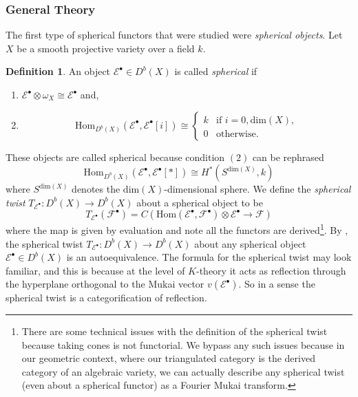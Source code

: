 \documentclass[oneside,reqno]{amsart}
\theoremstyle{definition}
\newtheorem{definition}{Definition}[section]
\theoremstyle{definition}
\theoremstyle{definition}
\theoremstyle{definition}
\newcommand{\Es}{\mathcal{E}}
\newcommand{\Fs}{\mathcal{F}}
\begin{document}
\subsubsection*{General Theory}
The first type of spherical functors that were studied were \textit{spherical objects}. Let $X$ be a smooth projective variety over a field $k$.
\begin{definition}\cite[Chapter 8]{huybrechts}
    \label{sphericalobject}
    An object $\Es^{\bullet} \in D^b(X)$ is called \textit{spherical} if 
    \begin{enumerate}
        \item $\Es^{\bullet} \otimes \omega_X \cong \Es^{\bullet}$ and,
        \item \[
        \text{Hom}_{D^b(X)}(\Es^{\bullet},\Es^{\bullet}[i]) \cong 
        \begin{cases}
            k & \text{if } i = 0, \text{dim}(X), \\
            0 & \text{otherwise}.
        \end{cases}
        \]
    \end{enumerate}
\end{definition}
These objects are called spherical because condition $(2)$ can be rephrased
$$
\text{Hom}_{D^b(X)}(\Es^{\bullet},\Es^{\bullet}[*]) \cong H^*(S^{\text{dim}(X)},k)
$$
where $S^{\text{dim}(X)}$ denotes the $\text{dim}(X)$-dimensional sphere. We define the \textit{spherical twist} $T_{\Es^{\bullet}} : D^b(X) \to D^b(X)$ about a spherical object to be 
\begin{equation}
    \label{sphericalobjecttwist}
    T_{\Es^{\bullet}} (\Fs^{\bullet}) = C\left( \text{Hom}(\Es^{\bullet}, \Fs^{\bullet})\otimes \Es^{\bullet} \xrightarrow{} \Fs\right)
\end{equation}
where the map is given by evaluation and note all the functors are derived\footnote{There are some technical issues with the definition of the spherical twist because taking cones is not functorial. We bypass any such issues because in our geometric context, where our triangulated category is the derived category of an algebraic variety, we can actually describe any spherical twist (even about a spherical functor) as a Fourier Mukai transform.}. By \cite[Proposition 8.6]{huybrechts}, the spherical twist $T_{\Es^{\bullet}}:D^b(X) \to D^b(X)$ about any spherical object $\Es^{\bullet}\in D^b(X)$ is an autoequivalence. The formula for the spherical twist may look familiar, and this is because at the level of $K$-theory it acts as reflection through the hyperplane orthogonal to the Mukai vector $v(\Es^{\bullet})$. So in a sense the spherical twist is a categorification of reflection. \\
\end{document}
